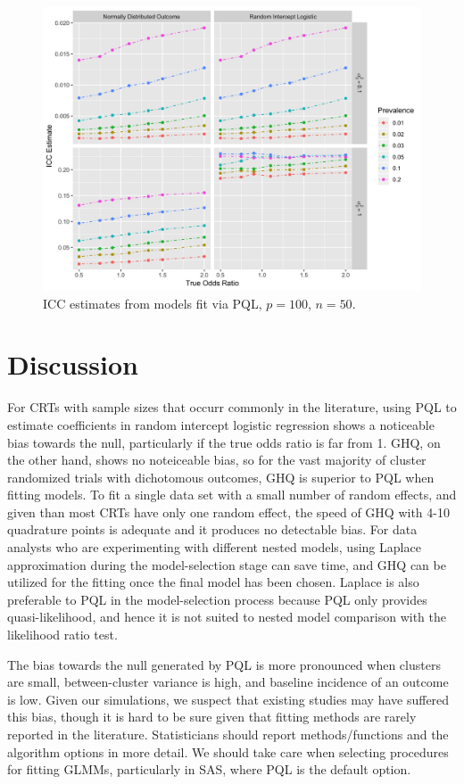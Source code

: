 \documentclass[Afour,times,sagev,doublespace]{sagej}
\begin{document}
\begin{figure}[]
\centering
\includegraphics[width=\linewidth]{_icc_p100_n50.png}
  \caption{ICC estimates from models fit via PQL, $p=100$, $n=50$.}
    \label{fig:_icc}
\end{figure}


\section{Discussion}

For CRTs with sample sizes that occurr commonly in the literature, using PQL to estimate coefficients in random intercept logistic regression shows a noticeable bias towards the null, particularly if the true odds ratio is far from 1. GHQ, on the other hand, shows no noteiceable bias, so for the vast majority of cluster randomized trials with dichotomous outcomes, GHQ is superior to PQL when fitting models. To fit a single data set with a small number of random effects, and given than most CRTs have only one random effect, the speed of GHQ with 4-10 quadrature points is adequate and it produces no detectable bias. For data analysts who are experimenting with different nested models, using Laplace approximation during the model-selection stage can save time, and GHQ can be utilized for the fitting once the final model has been chosen. Laplace is also preferable to PQL in the model-selection process because PQL only provides quasi-likelihood, and hence it is not suited to nested model comparison with the likelihood ratio test.

The bias towards the null generated by PQL is more pronounced when clusters are small, between-cluster variance is high, and baseline incidence of an outcome is low. Given our simulations, we suspect that existing studies may have suffered this bias, though it is hard to be sure given that fitting methods are rarely reported in the literature. Statisticians should report methods/functions and the algorithm options in more detail.  We should take care when selecting procedures for fitting GLMMs, particularly in SAS, where PQL is the default option.
\end{document}
